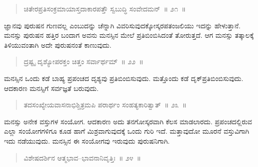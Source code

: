 \vspace{-0.3cm}

\begin{verse}
ಚಿತೇರಪ್ರತಿಸಂಕ್ರಮಾಯಾಸ್ತದಾಕಾರಪತ್ತೌ ಸ್ವಬುದ್ಧಿ ಸಂವೇದಮನ್​~॥ ೨೧~॥
\end{verse}

\vspace{-0.3cm}


\vskip 0.2cm

ಜ್ಞಾನವು ಪುರುಷನ ಗುಣವಲ್ಲ ಎಂಬುದನ್ನು ಚೆನ್ನಾಗಿ ವಿವರಿಸುವುದಕ್ಕೋಸ್ಕರ\break ಪತಂಜಲಿಯು ಇದನ್ನು ಹೇಳುತ್ತಾನೆ. ಮನಸ್ಸು ಪುರುಷನ ಹತ್ತಿರ ಬಂದಾಗ ಅವನು ಮನಸ್ಸಿನ ಮೇಲೆ ಪ್ರತಿಬಿಂಬಿಸಿದಂತೆ ತೋರುತ್ತದೆ. ಆಗ ಮನಸ್ಸು ತತ್ಕಾಲಕ್ಕೆ ತಿಳಿಯುವಂತಾಗಿ ಅದೇ ಪುರುಷನಂತೆ ಕಾಣುವುದು. 

\vspace{-0.3cm}

\begin{verse}
ದ್ರಷ್ಟೃ ದೃಶ್ಯೋಪರಕ್ತಂ ಚಿತ್ತಂ ಸರ್ವಾರ್ಥಮ್​~॥ ೨೨~॥
\end{verse}

\vspace{-0.3cm}


\vskip 0.2cm

ಮನಸ್ಸಿನ ಒಂದು ಕಡೆ ಬಾಹ್ಯ ಪ್ರಪಂಚದ ದೃಶ್ಯವು ಪ್ರತಿಬಿಂಬಿಸುವುದು. ಮತ್ತೊಂದು ಕಡೆ ದೃಕ್​ ಪ್ರತಿಬಿಂಬಿಸುವುದು. ಆದಕಾರಣ ಮನಸ್ಸಿಗೆ ಸರ್ವಜ್ಞತೆ ಬರುವುದು. 

\vspace{-0.3cm}

\begin{verse}
ತದಸಂಖ್ಯೇಯವಾಸನಾಭಿಶ್ಚಿತ್ರಮಪಿ ಪರಾರ್ಥಂ ಸಂಹತ್ಯಕಾರಿತ್ವಾತ್​~॥ ೨೩~॥
\end{verse}

\vspace{-0.3cm}


\vskip 0.2cm

ಮನಸ್ಸು ಅನೇಕ ವಸ್ತುಗಳ ಸಂಯೋಗ. ಆದಕಾರಣ ಅದು ತನಗೋಸ್ಕರವಾಗಿ ಕೆಲಸ ಮಾಡಲಾರದು. ಪ್ರಪಂಚದಲ್ಲಿರುವ ಎಲ್ಲಾ ಸಂಯೋಗಗಳಿಗೂ ಕೂಡ ಹಾಗೆ ಮಿಶ್ರವಾಗುವುದಕ್ಕೆ ಒಂದು ಗುರಿ ಇದೆ. ಮತ್ತಾವುದೋ ಮೂರನೆ ವಸ್ತುವಿಗಾಗಿ ಇದು ನಡೆಯುವುದು. ಮನಸ್ಸಿನ ಈ ಸಂಯೋಗವು ಇರುವುದು ಪುರುಷನಿಗಾಗಿ. 

\vspace{-0.3cm}

\begin{verse}
ವಿಶೇಷದರ್ಶಿನ ಆತ್ಮಭಾವ–ಭಾವನಾನಿವೃತ್ತಿಃ~॥ ೨೪~॥
\end{verse}

